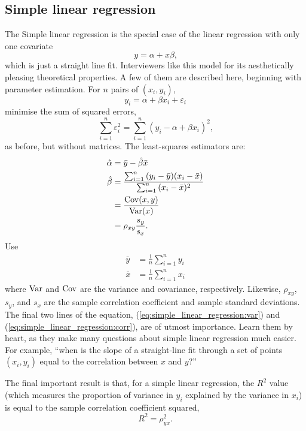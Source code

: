 \documentclass[a4paper]{article}
\begin{document}
\subsection{Simple linear regression}

The Simple linear regression is the special case of the linear regression with only one covariate
\[
  y = \alpha + x \beta
  \text{,}
\]
which is just a straight line fit.
Interviewers like this model for its aesthetically pleasing theoretical properties.
A few of them are described here, beginning with parameter estimation.
For $n$ pairs of $(x_i, y_i)$,
\[
  y_i = \alpha + \beta x_i + \varepsilon_i
\]
minimise the sum of squared errors,
\[
\sum_{i=1}^{n}{  \varepsilon_i^2 }
  =
\sum_{i=1}^{n}{ (y_i -  \alpha + \beta x_i)^2 }
\text{,}
\]
as before, but without matrices.
The least-squares estimators are:
\begin{align}
  \hat{\alpha} &= \bar{y} - \hat\beta \bar{x} \nonumber \\
  \hat{\beta} &=
  \frac
  {\sum_{i=1}^{n}{ (y_i - \bar{y}) (x_i - \bar{x}) }}
  {\sum_{i=1}^{n}{ (x_i - \bar{x})^2 }} \nonumber \\
  &=
  \frac
  {\operatorname{\mathrm{Cov}}(x, y)}
  {\operatorname{\mathrm{Var}}(x)} \label{eq:simple_linear_regression:var} \\
  &= \rho_{xy} \frac{s_y}{s_x} \label{eq:simple_linear_regression:corr}
  \text{.}
\end{align}
Use
\begin{align*}
\bar{y} &= \frac{1}{n}\sum_{i=1}^{n}{y_i} \\
\bar{x} &= \frac{1}{n}\sum_{i=1}^{n}{x_i}
\end{align*}
where $\operatorname{\mathrm{Var}}$ and $\operatorname{\mathrm{Cov}}$ are the variance and covariance, respectively.
Likewise,
$\rho_{xy}$,
$s_y$, and
$s_x$ are the sample correlation coefficient and sample standard deviations.
The final two lines of the equation,
(\ref{eq:simple_linear_regression:var})
and
(\ref{eq:simple_linear_regression:corr}),
are of utmost importance.
Learn them by heart, as they make many questions about simple linear regression much easier.
For example, ``when is the slope of a straight-line fit through a set of points $(x_i,y_i)$ equal to the correlation between $x$ and $y$?''

The final important result is that, for a simple linear regression, the $R^2$ value (which measures the proportion of variance in $y_i$ explained by the variance in $x_i$) is equal to the sample correlation coefficient squared,
\[
  R^2 = \rho_{yx}^2
  \text{.}
\]
\end{document}
